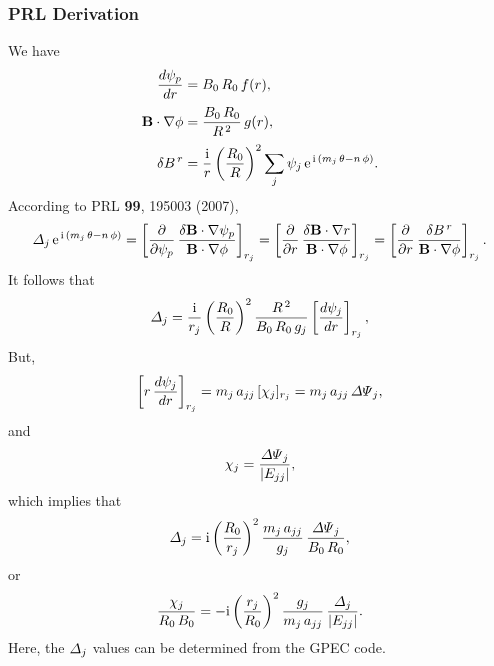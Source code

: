 \documentclass[12pt]{article}
\begin{document}
\subsubsection{PRL Derivation}
We have
\begin{align}
\frac{d\psi_p}{dr} &= B_0\,R_0\,f(r),\\[0.5ex]
{\bf B}\cdot\nabla \phi &= \frac{B_0\,R_0}{R^{\,2}}\,g(r),\\[0.5ex]
\delta B^{\,r}&= \frac{{\rm i}}{r}\left(\frac{R_0}{R}\right)^2\sum_j \psi_j\,{\rm e}^{\,{\rm i}\,(m_j\,\theta-n\,\phi)}.
\end{align}
According to PRL {\bf 99}, 195003 (2007),
\begin{equation}
{\mit\Delta}_j\,{\rm e}^{\,{\rm i}\,(m_j\,\theta-n\,\phi)} =\left[\frac{\partial}{\partial\psi_p}\,\frac{\delta {\bf B}\cdot\nabla\psi_p}{{\bf B}\cdot\nabla\phi}\right]_{r_j}=
\left[\frac{\partial}{\partial r}\,\frac{\delta {\bf B}\cdot\nabla r}{{\bf B}\cdot\nabla\phi}\right]_{r_j} = \left[\frac{\partial}{\partial r}\,\frac{\delta B^{\,r}}{{\bf B}\cdot\nabla\phi}\right]_{r_j} .
\end{equation}
It follows that
\begin{equation}
{\mit\Delta}_j = \frac{{\rm i}}{r_j}\left(\frac{R_0}{R}\right)^2\frac{R^{\,2}}{B_0\,R_0\,g_j}\left[\frac{d\psi_j}{dr}\right]_{r_j},
\end{equation}
But,
\begin{equation}
\left[r\,\frac{d\psi_j}{dr}\right]_{r_j} = m_j\,a_{jj}\,[\chi_j]_{r_j} =  m_j\,a_{jj}\,{\mit\Delta\Psi}_j,
\end{equation}
and
\begin{equation}
\chi_j =\frac{{\mit\Delta\Psi}_j}{|E_{jj}|},
\end{equation}
which implies that
\begin{align}
{\mit\Delta}_j ={\rm i}\left(\frac{R_0}{r_j}\right)^2 \frac{m_j\,a_{jj}}{g_j}\,\frac{{\mit\Delta\Psi}_j}{B_0\,R_0},
\end{align}
or
\begin{align}
\frac{\chi_j}{R_0\,B_0} = -{\rm i}\left(\frac{r_j}{R_0}\right)^2 \frac{g_j}{m_j\,a_{jj}}\,\frac{{\mit\Delta}_j}{|E_{jj}|}.
\end{align}
Here, the ${\mit\Delta}_j$ values can be determined from the GPEC code. 
\end{document}
